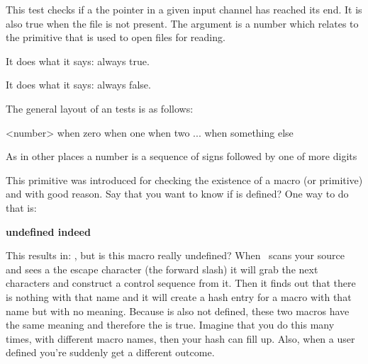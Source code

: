 \stopsubsection

\startsubsection[title={\tex{ifeof}}]

This test checks if a the pointer in a given input channel has reached its end.
It is also true when the file is not present. The argument is a number which
relates to the \type {\openin} primitive that is used to open files for reading.

\stopsubsection

\startsubsection[title={\tex{iftrue}}]

It does what it says: always true.

\stopsubsection

\startsubsection[title={\tex{iffalse}}]

It does what it says: always false.

\stopsubsection

\startsubsection[title={\tex{ifcase}}]

The general layout of an \type {\ifcase} tests is as follows:

\starttyping[option=TEX]
\ifcase<number>
    when zero
\or
    when one
\or
    when two
\or
    ...
\else
    when something else
\fi
\stoptyping

As in other places a number is a sequence of signs followed by one of more digits

\stopsubsection

\stopsection

\startsection[title={\ETEX\ primitives}]

\startsubsection[title={\tex{ifdefined}}]

This primitive was introduced for checking the existence of a macro (or primitive)
and with good reason. Say that you want to know if \type {\MyMacro} is defined? One
way to do that is:

\startbuffer
\ifx\MyMacro\undefined
    {\bf undefined indeed}
\fi
\stopbuffer

\typebuffer[option=TEX]

This results in: \inlinebuffer , but is this macro really undefined? When \TEX\
scans your source and sees a the escape character (the forward slash) it will
grab the next characters and construct a control sequence from it. Then it finds
out that there is nothing with that name and it will create a hash entry for a
macro with that name but with no meaning. Because \type {\undefined} is also not
defined, these two macros have the same meaning and therefore the \type {\ifx} is
true. Imagine that you do this many times, with different macro names, then your
hash can fill up. Also, when a user defined \type {\undefined} you're suddenly
get a different outcome.

